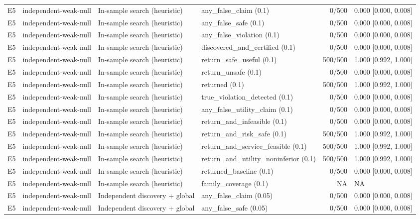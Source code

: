 \begin{longtable}{p{.04\linewidth}p{.18\linewidth}p{.19\linewidth}p{.16\linewidth}r p{.21\linewidth}}
E5 & independent-weak-null & In-sample search (heuristic) & any\_false\_claim (0.1) & 0/500 & 0.000 [0.000, 0.008]\\
E5 & independent-weak-null & In-sample search (heuristic) & any\_false\_safe (0.1) & 0/500 & 0.000 [0.000, 0.008]\\
E5 & independent-weak-null & In-sample search (heuristic) & any\_false\_violation (0.1) & 0/500 & 0.000 [0.000, 0.008]\\
E5 & independent-weak-null & In-sample search (heuristic) & discovered\_and\_certified (0.1) & 0/500 & 0.000 [0.000, 0.008]\\
E5 & independent-weak-null & In-sample search (heuristic) & return\_safe\_useful (0.1) & 500/500 & 1.000 [0.992, 1.000]\\
E5 & independent-weak-null & In-sample search (heuristic) & return\_unsafe (0.1) & 0/500 & 0.000 [0.000, 0.008]\\
E5 & independent-weak-null & In-sample search (heuristic) & returned (0.1) & 500/500 & 1.000 [0.992, 1.000]\\
E5 & independent-weak-null & In-sample search (heuristic) & true\_violation\_detected (0.1) & 0/500 & 0.000 [0.000, 0.008]\\
E5 & independent-weak-null & In-sample search (heuristic) & any\_false\_utility\_claim (0.1) & 0/500 & 0.000 [0.000, 0.008]\\
E5 & independent-weak-null & In-sample search (heuristic) & return\_and\_infeasible (0.1) & 0/500 & 0.000 [0.000, 0.008]\\
E5 & independent-weak-null & In-sample search (heuristic) & return\_and\_risk\_safe (0.1) & 500/500 & 1.000 [0.992, 1.000]\\
E5 & independent-weak-null & In-sample search (heuristic) & return\_and\_service\_feasible (0.1) & 500/500 & 1.000 [0.992, 1.000]\\
E5 & independent-weak-null & In-sample search (heuristic) & return\_and\_utility\_noninferior (0.1) & 500/500 & 1.000 [0.992, 1.000]\\
E5 & independent-weak-null & In-sample search (heuristic) & returned\_baseline (0.1) & 0/500 & 0.000 [0.000, 0.008]\\
E5 & independent-weak-null & In-sample search (heuristic) & family\_coverage (0.1) & NA & NA\\
E5 & independent-weak-null & Independent discovery + global & any\_false\_claim (0.05) & 0/500 & 0.000 [0.000, 0.008]\\
E5 & independent-weak-null & Independent discovery + global & any\_false\_safe (0.05) & 0/500 & 0.000 [0.000, 0.008]\\

\end{longtable}
